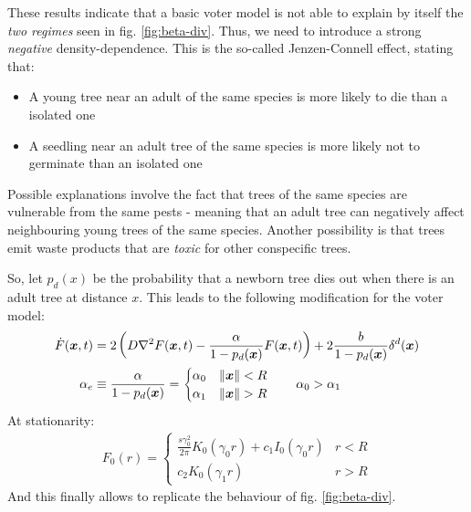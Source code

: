 \documentclass[../../main.tex]{subfiles}
\begin{document}
These results indicate that a basic voter model is not able to explain by itself the \textit{two regimes} seen in fig. \ref{fig:beta-div}. Thus, we need to introduce  a strong \textit{negative} density-dependence. This is the so-called Jenzen-Connell effect, stating that:
\begin{itemize}
    \item A young tree near an adult of the same species is more likely to die than a isolated one
    \item A seedling near an adult tree of the same species is more likely not to germinate than an isolated one
\end{itemize}
Possible explanations involve the fact that trees of the same species are vulnerable from the same pests - meaning that an  adult tree can negatively affect neighbouring young trees of the same species. Another possibility is that trees emit waste products that are \textit{toxic} for other conspecific trees. 

\medskip

So, let $p_d(x)$ be the probability that a newborn tree dies out when there is an adult tree at distance $x$. This leads to the following modification for the voter model:
\begin{align*}
    \dot{F}(\bm{x},t) &= 2\left(D \nabla^2 F(\bm{x},t) - \frac{\alpha}{1-p_d(\bm{x})} F(\bm{x},t) \right) + 2 \frac{b}{1-p_d(\bm{x})} \delta^d(\bm{x})\\
    \alpha_e &\equiv \frac{\alpha}{1-p_d(\bm{x})}  = \begin{cases}
        \alpha_0 & \norm{\bm{x}} < R\\
        \alpha_1 & \norm{\bm{x}} > R
    \end{cases} \qquad \alpha_0 > \alpha_1
\end{align*}
At stationarity:
\begin{align*}
    F_0(r) = \begin{cases}
        \frac{s \gamma_0^2}{2 \pi} K_0(\gamma_0 r) + c_1 I_0(\gamma_0 r) & r < R\\
        c_2 K_0(\gamma_1 r) & r > R 
    \end{cases}
\end{align*}
And this finally allows to replicate the behaviour of fig. \ref{fig:beta-div}.
 
\end{document}
